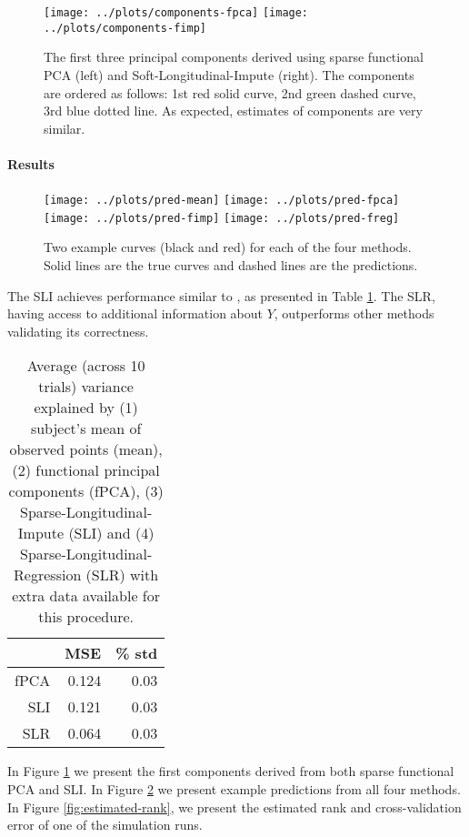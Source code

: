 \documentclass[preprint]{imsart}
\numberwithin{equation}{section}
\theoremstyle{plain}
\begin{document}
 \begin{figure}[h!]
  \texttt{[image: ../plots/components-fpca]}
  \texttt{[image: ../plots/components-fimp]}
  \caption{The first three principal components derived using sparse functional PCA (left) and Soft-Longitudinal-Impute (right). The components are ordered as follows: 1st red solid curve, 2nd green dashed curve, 3rd blue dotted line. As expected, estimates of components are very similar.}
  \label{fig:principal-components}
\end{figure}

\paragraph{Results}

\begin{figure}[h!]
  \texttt{[image: ../plots/pred-mean]}
  \texttt{[image: ../plots/pred-fpca]}
  \texttt{[image: ../plots/pred-fimp]}
  \texttt{[image: ../plots/pred-freg]}
  \caption{Two example curves (black and red) for each of the four methods. Solid lines are the true curves and dashed lines are the predictions. }
  \label{fig:example-predictions}
\end{figure}

The SLI achieves performance similar to \citep{james2000principal}, as presented in Table \ref{tbl:simulations}. The SLR, having access to additional information about $Y$, outperforms other methods validating its correctness.

\begin{table}[ht]
\centering
\begin{tabular}{rrr}
  \hline
 & MSE & \% std \\ 
  \hline
  fPCA & 0.124 & 0.03 \\ 
  SLI & 0.121 & 0.03 \\ 
  SLR & 0.064 & 0.03 \\ 
   \hline
\end{tabular}\label{tbl:simulations}
\caption{Average (across 10 trials) variance explained by (1) subject's mean of observed points (mean), (2) functional principal components (fPCA), (3) Sparse-Longitudinal-Impute (SLI) and (4) Sparse-Longitudinal-Regression (SLR) with extra data available for this procedure.}
\end{table}

In Figure \ref{fig:principal-components} we present the first components derived from both sparse functional PCA and SLI. In Figure \ref{fig:example-predictions} we present example predictions from all four methods. In Figure \ref{fig:estimated-rank}, we present the estimated rank and cross-validation error of one of the simulation runs.
\end{document}
